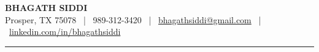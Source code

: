 \documentclass[10pt, letterpaper]{extarticle}
\begin{document}
\begin{center}
    {\huge \textbf{BHAGATH SIDDI}} \\
    \vspace{4pt}
    \small Prosper, TX 75078 \ | \ 989-312-3420 \ | \ \href{mailto:bhagathsiddi@gmail.com}{bhagathsiddi@gmail.com} \ | \ \href{https://www.linkedin.com/in/bhagathsiddi}{linkedin.com/in/bhagathsiddi}
\end{center}

\vspace{5pt}
\hrule
\vspace{25pt}

\noindent
\end{document}
